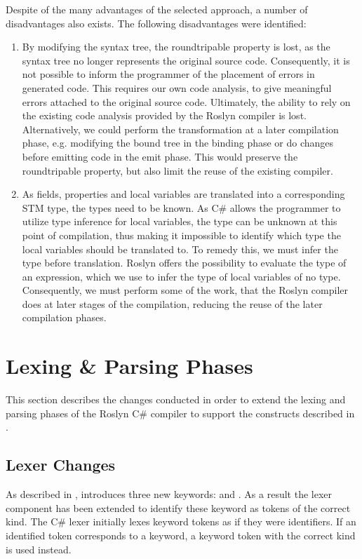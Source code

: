 Despite of the many advantages of the selected approach, a number of disadvantages also exists. The following disadvantages were identified:
\begin{enumerate}
	\item By modifying the syntax tree, the roundtripable property is lost, as the syntax tree no longer represents the original source code. Consequently, it is not possible to inform the programmer of the placement of errors in generated code. This requires our own code analysis, to give meaningful errors attached to the original source code. Ultimately, the ability to rely on the existing code analysis provided by the Roslyn compiler is lost. Alternatively, we could perform the transformation at a later compilation phase, e.g. modifying the bound tree in the binding phase or do changes before emitting code in the emit phase. This would preserve the roundtripable property, but also limit the reuse of the existing compiler. 
	
	\item As  fields, properties and local variables are translated into a corresponding \ac{STM} type, the types need to be known. As C\# allows the programmer to utilize type inference for local variables, the type can be unknown at this point of compilation, thus making it impossible to identify which type the local variables should be translated to. To remedy this, we must infer the type before translation. Roslyn offers the possibility to evaluate the type of an expression, which we use to infer the type of  local variables of no type. Consequently, we must perform some of the work, that the Roslyn compiler does at later stages of the compilation, reducing the reuse of the later compilation phases.
\end{enumerate}

\section{Lexing \& Parsing Phases}
This section describes the changes conducted in order to extend the lexing and parsing phases of the Roslyn C\# compiler to support the constructs described in .
\label{sec:roslyn_lexer_parser_changes}

\subsection{Lexer Changes}
As described in , \stmnamesp introduces three new keywords:   and . As a result the lexer component has been extended to identify these keyword as tokens of the correct kind. The C\# lexer initially lexes keyword tokens as if they were identifiers. If an identified token corresponds to a keyword, a keyword token with the correct kind is used instead. 

